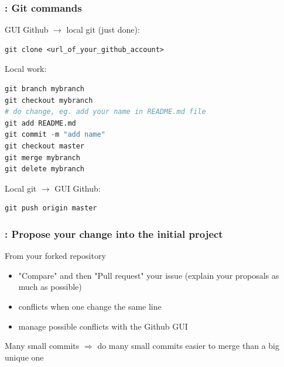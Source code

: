 \begin{frame}[containsverbatim]
\frametitle{: Git commands}
\begin{exampleblock}{GUI Github $\rightarrow$ local git (just done):}
\begin{lstlisting}
git clone <url_of_your_github_account>
\end{lstlisting}
\end{exampleblock}
\begin{exampleblock}{Local work:}
\begin{lstlisting}[language=python]
git branch mybranch
git checkout mybranch
# do change, eg. add your name in README.md file
git add README.md
git commit -m "add name"
git checkout master
git merge mybranch
git delete mybranch
\end{lstlisting}
\end{exampleblock}
\begin{exampleblock}{Local git $\rightarrow$ GUI Github:}
\begin{lstlisting}
git push origin master
\end{lstlisting}
\end{exampleblock}
\end{frame}
\begin{frame}[containsverbatim]
\frametitle{: Propose your change into the initial project}
\begin{exampleblock}{From your forked repository} 
\begin{itemize}
    \item "Compare" and then "Pull request" your issue (explain your proposals as much as possible)
    \item conflicts when one change the same line 
    \item manage possible conflicts with the Github GUI
\end{itemize}
\end{exampleblock}
\begin{exampleblock}{Many small commits} 
$\Rightarrow$ do many small commits easier to merge than a big unique one
\end{exampleblock}
\end{frame}
